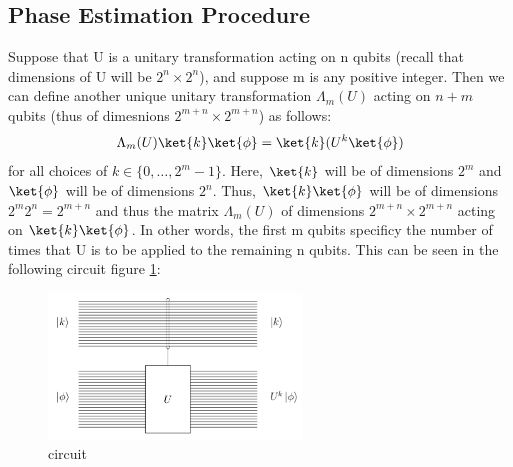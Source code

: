 \documentclass[12pt, oneside]{book}
\theoremstyle{definition}
\theoremstyle{definition}
\theoremstyle{remark}
\begin{document}
\subsection{Phase Estimation Procedure}
Suppose that U is a unitary transformation acting on n qubits (recall that dimensions of U will be $2^n \times 2^n$), and suppose m is any positive integer. 
Then we can define another unique unitary transformation $\Lambda_m(U)$ acting on $n+m$ qubits (thus of dimesnions $2^{m+n} \times 2^{m+n}$) as follows:
\[
\Lambda_m(U)\ket{k}\ket{\phi}=\ket{k}(U^k\ket{\phi})
\]
for all choices of  $k\in\{0,\ldots,2^{m}-1\}$. Here, $\ket{k}$ will be of dimensions $2^m$ and $\ket{\phi}$ will be of dimensions $2^n$. Thus, $\ket{k}\ket{\phi}$ will be of dimensions $2^{m}2^n=2^{m+n}$ and thus the matrix 
$\Lambda_m(U)$ of dimensions $2^{m+n} \times 2^{m+n}$ acting on $\ket{k}\ket{\phi}$. 
In other words, the first m qubits specificy the number of times that U is to be applied to the remaining n qubits. This can be seen in the following circuit figure \ref{fig:phaseestimation1}:
\begin{figure}[H]
    \centering
    \includegraphics[width=0.6\textwidth]{../images/phaseest1.png}
    \caption{circuit}
    \label{fig:phaseestimation1}
\end{figure}
\end{document}
